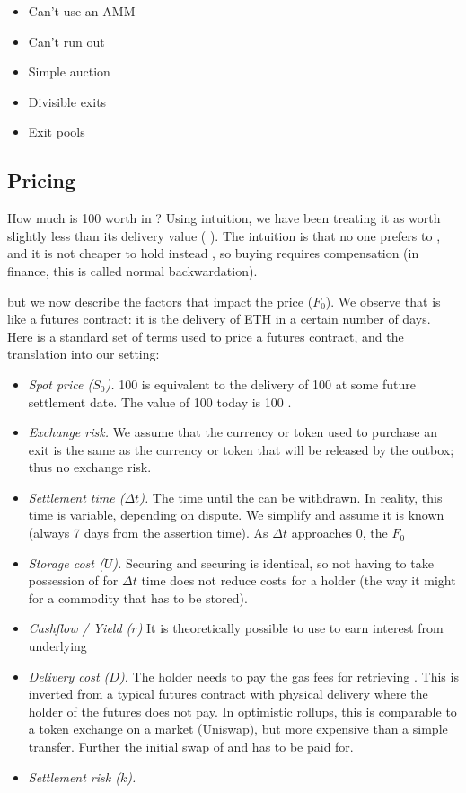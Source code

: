\begin{itemize}
\item Can't use an AMM 
\item Can't run out
\item Simple auction
\item Divisible exits
\item Exit pools
\end{itemize}

\subsection{Pricing} 

How much is 100 \ethxx worth in \ethone? Using intuition, we have been treating it as worth slightly less than its delivery value ( \ethone). The intuition is that no one prefers \ethxx to \ethone, and it is not cheaper to hold \ethxx instead \ethone, so buying \ethxx requires compensation (in finance, this is called normal backwardation). 

 but we now describe the factors that impact the price ($F_0$). We observe that \ethxx is like a futures contract: it is the delivery of ETH in a certain number of days. Here is a standard set of terms used to price a futures contract, and the translation into our setting:

\begin{itemize}
\item \textit{Spot price ($S_0$).} 100 \ethxx is equivalent to the delivery of 100 \ethone at some future settlement date. The value of 100 \ethone today is 100 \ethone. 
\item \textit{Exchange risk.} We assume that the currency or token used to purchase an exit is the same as the currency or token that will be released by the outbox; thus no exchange risk. 
\item \textit{Settlement time ($\Delta t$).} The time until the \ethone can be withdrawn. In reality, this time is variable, depending on dispute. We simplify and assume it is known (\eg always 7 days from the assertion time). As $\Delta t$ approaches 0, the $F_0$ 
\item \textit{Storage cost ($U$).} Securing \ethxx and securing \ethone is identical, so not having to take possession of \ethone for $\Delta t$ time does not reduce costs for a \ethxx holder (the way it might for a commodity that has to be stored). 
\item \textit{Cashflow / Yield ($r$)} It is theoretically possible to use \ethone to earn interest    from underlying
\item \textit{Delivery cost ($D$).}  The \ethxx holder needs to pay the gas fees for retrieving \ethone. This is inverted from a typical futures contract with physical delivery where the holder of the futures does not pay.  In optimistic rollups, this is comparable to a token exchange on a market (\eg Uniswap), but more expensive than a simple \ethone transfer. Further the initial swap of \ethxx and \ethone has to be paid for. 
\item \textit{Settlement risk ($k$).} 

\end{itemize}

